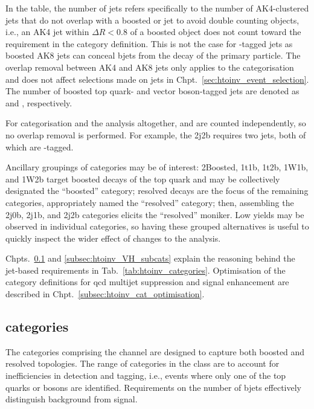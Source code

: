 In the table, the number of \glspl{jet} \njet refers specifically to the number of AK4-clustered \glspl{jet} that do not overlap with a boosted \Ptop or \PVec \gls{jet} to avoid double counting objects, i.e., an AK4 \gls{jet} within $\Delta R < \text{0.8}$ of a boosted object does not count toward the \njet requirement in the category definition. This is not the case for \Pqb-tagged \glspl{jet} as boosted AK8 \glspl{jet} can conceal \glspl{bjet} from the decay of the primary particle. The overlap removal between AK4 and AK8 \glspl{jet} only applies to the categorisation and does not affect selections made on \glspl{jet} in Chpt.~\ref{sec:htoinv_event_selection}. The number of boosted top quark- and vector boson-tagged \glspl{jet} are denoted as \nBoostedTop and \nBoostedV, respectively.

For categorisation and the analysis altogether, \njet and \nbjet are counted independently, so no overlap removal is performed. For example, the \VH 2j2b requires two \glspl{jet}, both of which are \Pbottom-tagged.

Ancillary groupings of categories may be of interest: 2Boosted, 1t1b, 1t2b, 1W1b, and 1W2b target boosted decays of the top quark and may be collectively designated the ``\ttH boosted'' category; resolved decays are the focus of the remaining categories, appropriately named the ``\ttH resolved'' category; then, assembling the 2j0b, 2j1b, and 2j2b \VH categories elicits the ``\VH resolved'' moniker. Low yields may be observed in individual categories, so having these grouped alternatives is useful to quickly inspect the wider effect of changes to the analysis.

Chpts.~\ref{subsec:htoinv_ttH_subcats} and \ref{subsec:htoinv_VH_subcats} explain the reasoning behind the \gls{jet}-based requirements in Tab.~\ref{tab:htoinv_categories}. Optimisation of the category definitions for \acrshort{qcd} multijet suppression and signal enhancement are described in Chpt.~\ref{subsec:htoinv_cat_optimisation}.




\subsection{\texorpdfstring{\ttH}{ttH} categories}
\label{subsec:htoinv_ttH_subcats}

The categories comprising the \ttH channel are designed to capture both boosted and resolved topologies. The range of categories in the class are to account for inefficiencies in detection and tagging, i.e., events where only one of the top quarks or \PW bosons are identified. Requirements on the number of \glspl{bjet} effectively distinguish background from signal.

